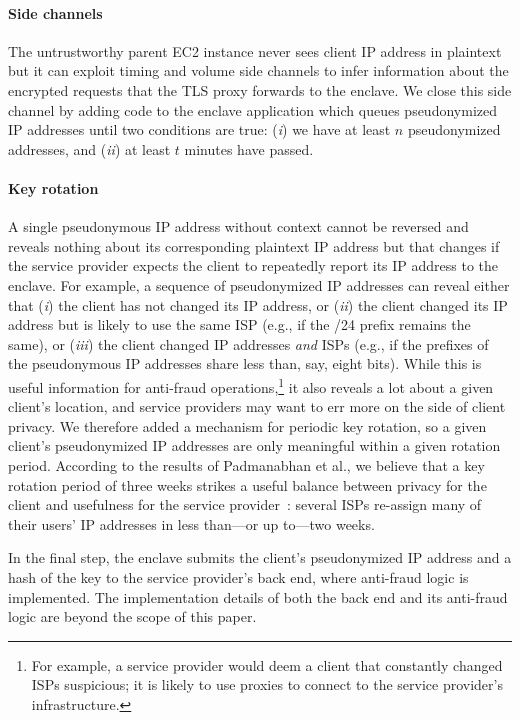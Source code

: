 \paragraph{Side channels}
The untrustworthy parent EC2 instance never sees client IP address in plaintext
but it can exploit timing and volume side channels to infer information about
the encrypted requests that the TLS proxy forwards to the enclave.  We close
this side channel by adding code to the enclave application which queues
pseudonymized IP addresses until two conditions are true: (\emph{i}) we have at
least $n$ pseudonymized addresses, and (\emph{ii}) at least $t$ minutes have
passed.

\paragraph{Key rotation}
A single pseudonymous IP address without context cannot be reversed and reveals
nothing about its corresponding plaintext IP address but that changes if the
service provider expects the client to repeatedly report its IP address to the
enclave.  For example, a sequence of pseudonymized IP addresses can reveal
either that (\emph{i}) the client has not changed its IP address, or (\emph{ii})
the client changed its IP address but is likely to use the same ISP (e.g., if
the /24 prefix remains the same), or (\emph{iii}) the client changed IP
addresses \emph{and} ISPs (e.g., if the prefixes of the pseudonymous IP
addresses share less than, say, eight bits).  While this is useful information
for anti-fraud operations,\footnote{For example, a service provider would deem a
client that constantly changed ISPs suspicious; it is likely to use proxies to
connect to the service provider's infrastructure.} it also reveals a lot about a
given client's location, and service providers may want to err more on the side
of client privacy.  We therefore added a mechanism for periodic key rotation, so
a given client's pseudonymized IP addresses are only meaningful within a given
rotation period.  According to the results of Padmanabhan et al., we believe
that a key rotation period of three weeks strikes a useful balance between
privacy for the client and usefulness for the service
provider~\cite[\S~3.2]{Padmanabhan20a}: several ISPs re-assign many of their
users' IP addresses in less than---or up to---two weeks.

In the final step, the enclave submits the client's pseudonymized IP address and
a hash of the key to the service provider's back end, where anti-fraud logic is
implemented.  The implementation details of both the back end and its anti-fraud
logic are beyond the scope of this paper.

